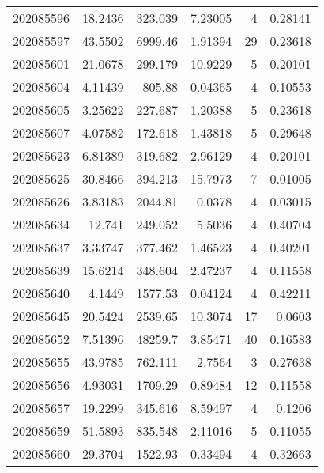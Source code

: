 \begin{tabular}{rrrrrr}
 202085596 &         18.2436  &      323.039  &            7.23005 &           4 & 0.28141 \\
 202085597 &         43.5502  &     6999.46   &            1.91394 &          29 & 0.23618 \\
 202085601 &         21.0678  &      299.179  &           10.9229  &           5 & 0.20101 \\
 202085604 &          4.11439 &      805.88   &            0.04365 &           4 & 0.10553 \\
 202085605 &          3.25622 &      227.687  &            1.20388 &           5 & 0.23618 \\
 202085607 &          4.07582 &      172.618  &            1.43818 &           5 & 0.29648 \\
 202085623 &          6.81389 &      319.682  &            2.96129 &           4 & 0.20101 \\
 202085625 &         30.8466  &      394.213  &           15.7973  &           7 & 0.01005 \\
 202085626 &          3.83183 &     2044.81   &            0.0378  &           4 & 0.03015 \\
 202085634 &         12.741   &      249.052  &            5.5036  &           4 & 0.40704 \\
 202085637 &          3.33747 &      377.462  &            1.46523 &           4 & 0.40201 \\
 202085639 &         15.6214  &      348.604  &            2.47237 &           4 & 0.11558 \\
 202085640 &          4.1449  &     1577.53   &            0.04124 &           4 & 0.42211 \\
 202085645 &         20.5424  &     2539.65   &           10.3074  &          17 & 0.0603  \\
 202085652 &          7.51396 &    48259.7    &            3.85471 &          40 & 0.16583 \\
 202085655 &         43.9785  &      762.111  &            2.7564  &           3 & 0.27638 \\
 202085656 &          4.93031 &     1709.29   &            0.89484 &          12 & 0.11558 \\
 202085657 &         19.2299  &      345.616  &            8.59497 &           4 & 0.1206  \\
 202085659 &         51.5893  &      835.548  &            2.11016 &           5 & 0.11055 \\
 202085660 &         29.3704  &     1522.93   &            0.33494 &           4 & 0.32663 \\

\end{tabular}
